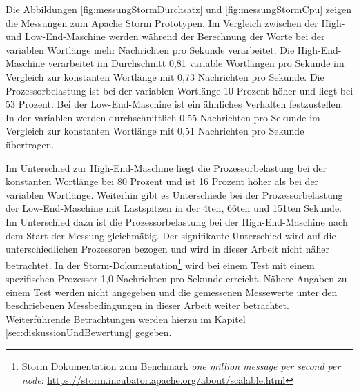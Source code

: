Die Abbildungen \ref{fig:messungStormDurchsatz} und \ref{fig:messungStormCpu} zeigen die Messungen zum Apache Storm Prototypen. Im Vergleich zwischen der High- und Low-End-Maschine werden während der Berechnung der Worte bei der variablen Wortlänge mehr Nachrichten pro Sekunde verarbeitet. Die High-End-Maschine verarbeitet im Durchschnitt 0,81 variable Wortlängen pro Sekunde im Vergleich zur konstanten Wortlänge mit 0,73 Nachrichten pro Sekunde. Die Prozessorbelastung ist bei der variablen Wortlänge 10 Prozent höher und liegt bei 53 Prozent. Bei der Low-End-Maschine ist ein ähnliches Verhalten festzustellen. In der variablen werden durchschnittlich 0,55 Nachrichten pro Sekunde im Vergleich zur konstanten Wortlänge mit 0,51 Nachrichten pro Sekunde übertragen. 

Im Unterschied zur High-End-Maschine liegt die Prozessorbelastung bei der konstanten Wortlänge bei 80 Prozent und ist 16 Prozent höher als bei der variablen Wortlänge. Weiterhin gibt es Unterschiede bei der Prozessorbelastung der Low-End-Maschine mit Lastspitzen in der 4ten, 66ten und 151ten Sekunde. Im Unterschied dazu ist die Prozessorbelastung bei der High-End-Maschine nach dem Start der Messung gleichmäßig. Der signifikante Unterschied wird auf die unterschiedlichen Prozessoren bezogen und wird in dieser Arbeit nicht näher betrachtet. In der Storm-Dokumentation\footnote{Storm Dokumentation zum Benchmark \textit{one million message per second per node}: \url{https://storm.incubator.apache.org/about/scalable.html}} wird bei einem Test mit einem spezifischen Prozessor 1,0 Nachrichten pro Sekunde erreicht. Nähere Angaben zu einem Test werden nicht angegeben und die gemessenen Messewerte unter den beschriebenen Messbedingungen in dieser Arbeit weiter betrachtet. Weiterführende Betrachtungen werden hierzu im Kapitel \ref{sec:diskussionUndBewertung} gegeben.


